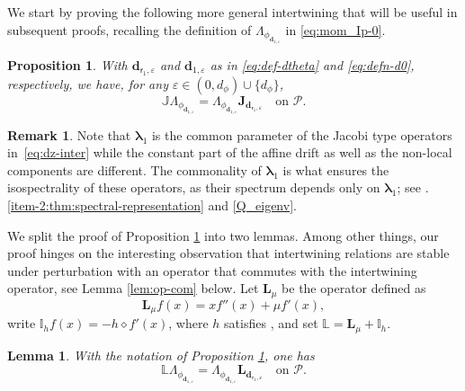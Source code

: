 \documentclass[10pt]{amsart}
\let\epsilon\varepsilon
\theoremstyle{plain}
\newtheorem{lemma}[theorem]{Lemma}
\newtheorem{proposition}[theorem]{Proposition}
\theoremstyle{definition}
\newtheorem{remark}[theorem]{Remark}
\newcommand{\Poly}{\mathscr{P}}
\newcommand{\calI}{\mathds{I}}
\newcommand{\calL}{\mathds{L}}
\newcommand{\calLd}{\mathbf{L}}
\newcommand{\calJ}{\mathds{J}}
\newcommand{\calJd}{\mathbf{J}}
\newcommand{\dpt}{\bm{d}_{\vat,\epsilon}}
\newcommand{\dz}{{\bm{d}}_{1,\epsilon}}
\newcommand{\lam}{{\bm{\lambda}_1}}
\newcommand{\vat}{{\mathsf{r}_1}}
\let\mo\mu
\begin{document}
We start by proving the following more general intertwining that will be useful in subsequent proofs, recalling the definition of $\Lambda_{\phi_{\dz}}$ in \eqref{eq:mom_Ip-0}.

\begin{proposition}
\label{prop:inter_P}
With $\dpt$ and $\dz$ as in \eqref{eq:def-dtheta} and \eqref{eq:defn-d0}, respectively, we have, for any $\epsilon \in (0,d_\phi) \cup \{d_\phi\}$,\vspace*{-3pt}
\begin{equation}
\label{eq:dz-inter}
\calJ \Lambda_{\phi_{\dz}} = \Lambda_{\phi_{\dz}} \calJd_{\dpt} \quad \text{on } \Poly.
\end{equation}
\end{proposition}

\begin{remark}
Note that $\lam$ is the common parameter of the Jacobi type operators in~\eqref{eq:dz-inter} while the constant part of the affine drift as well as the non-local components are different. The commonality of $\lam$ is what ensures the isospectrality of these operators, as their spectrum depends only on $\lam$; see .\eqref{item-2:thm:spectral-representation} and \eqref{Q_eigenv}.
\end{remark}

We split the proof of Proposition \ref{prop:inter_P} into two lemmas. Among other things, our proof hinges on the interesting observation that intertwining relations are stable under perturbation with an operator that commutes with the intertwining operator, see Lemma \ref{lem:op-com} below. Let $\calLd_\mo$ be the operator defined as\vspace*{-3pt}
\begin{equation}
\label{eq:defL}
\calLd_\mo f(x) = xf''(x) + \mo f'(x),
\end{equation}
write $\calI_h f(x) = - h \diamond f'(x)$, where $h$ satisfies , and set $\calL = \calLd_\mo + \calI_h$.

\begin{lemma} \label{lem:inter} With the notation of Proposition \ref{prop:inter_P}, one has
\begin{equation}
\calL \Lambda_{\phi_{\dz}} = \Lambda_{\phi_{\dz}}\calLd_{\dpt} \quad \mbox{on } \Poly.
\end{equation}
\end{lemma}
\end{document}
